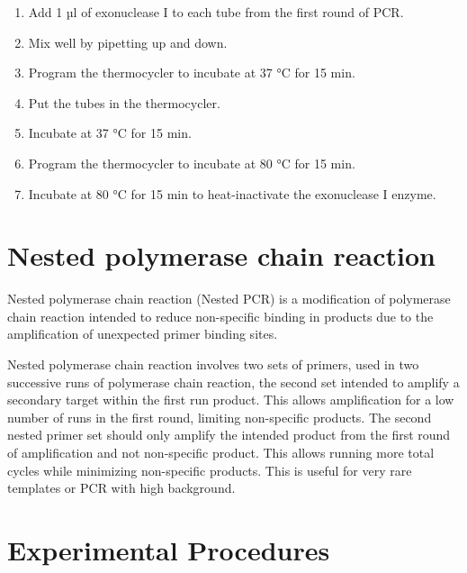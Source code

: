\documentclass[]{book}
\providecommand{\tightlist}{%
  \setlength{\itemsep}{0pt}\setlength{\parskip}{0pt}}
\begin{document}
\begin{enumerate}
\def\labelenumi{\arabic{enumi}.}
\tightlist
\item
  Add 1 µl of exonuclease I to each tube from the first round of PCR.
\item
  Mix well by pipetting up and down.
\item
  Program the thermocycler to incubate at 37 °C for 15 min.
\item
  Put the tubes in the thermocycler.
\item
  Incubate at 37 °C for 15 min.
\item
  Program the thermocycler to incubate at 80 °C for 15 min.
\item
  Incubate at 80 °C for 15 min to heat-inactivate the exonuclease I enzyme.
\end{enumerate}

\hypertarget{nested-polymerase-chain-reaction}{%
\section{Nested polymerase chain reaction}\label{nested-polymerase-chain-reaction}}

Nested polymerase chain reaction (Nested PCR) is a modification of polymerase chain reaction intended to reduce non-specific binding in products due to the amplification of unexpected primer binding sites.

Nested polymerase chain reaction involves two sets of primers, used in two successive runs of polymerase chain reaction, the second set intended to amplify a secondary target within the first run product. This allows amplification for a low number of runs in the first round, limiting non-specific products. The second nested primer set should only amplify the intended product from the first round of amplification and not non-specific product. This allows running more total cycles while minimizing non-specific products. This is useful for very rare templates or PCR with high background.

\hypertarget{experimental-procedures-11}{%
\section{Experimental Procedures}\label{experimental-procedures-11}}
\end{document}
